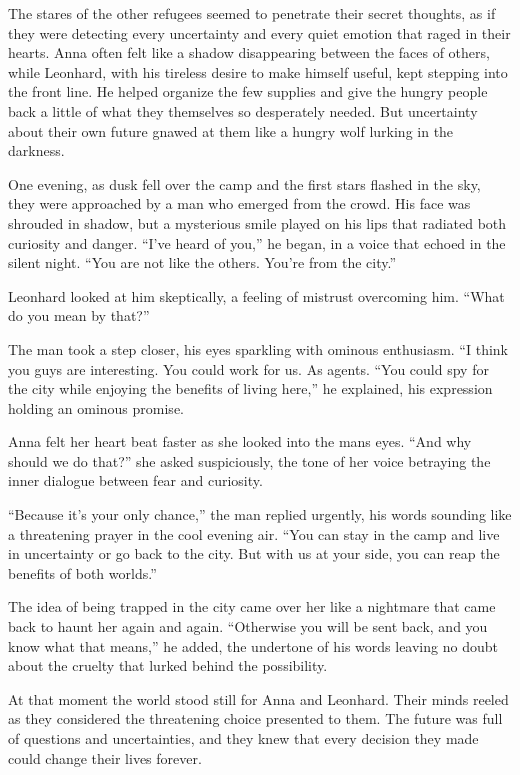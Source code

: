 \documentclass[
]{article}
\begin{document}
The stares of the other refugees seemed to penetrate their secret
thoughts, as if they were detecting every uncertainty and every quiet
emotion that raged in their hearts. Anna often felt like a shadow
disappearing between the faces of others, while Leonhard, with his
tireless desire to make himself useful, kept stepping into the front
line. He helped organize the few supplies and give the hungry people
back a little of what they themselves so desperately needed. But
uncertainty about their own future gnawed at them like a hungry wolf
lurking in the darkness.

One evening, as dusk fell over the camp and the first stars flashed in
the sky, they were approached by a man who emerged from the crowd. His
face was shrouded in shadow, but a mysterious smile played on his lips
that radiated both curiosity and danger. ``I've heard of you,'' he
began, in a voice that echoed in the silent night. ``You are not like
the others. You're from the city.''

Leonhard looked at him skeptically, a feeling of mistrust overcoming
him. ``What do you mean by that?''

The man took a step closer, his eyes sparkling with ominous enthusiasm.
``I think you guys are interesting. You could work for us. As agents.
``You could spy for the city while enjoying the benefits of living
here,'' he explained, his expression holding an ominous promise.

Anna felt her heart beat faster as she looked into the
man\textquotesingle s eyes. ``And why should we do that?'' she asked
suspiciously, the tone of her voice betraying the inner dialogue between
fear and curiosity.

``Because it's your only chance,'' the man replied urgently, his words
sounding like a threatening prayer in the cool evening air. ``You can
stay in the camp and live in uncertainty or go back to the city. But
with us at your side, you can reap the benefits of both worlds.''

The idea of \hspace{0pt}\hspace{0pt}being trapped in the city came over
her like a nightmare that came back to haunt her again and again.
``Otherwise you will be sent back, and you know what that means,'' he
added, the undertone of his words leaving no doubt about the cruelty
that lurked behind the possibility.

At that moment the world stood still for Anna and Leonhard. Their minds
reeled as they considered the threatening choice presented to them. The
future was full of questions and uncertainties, and they knew that every
decision they made could change their lives forever.
\end{document}

